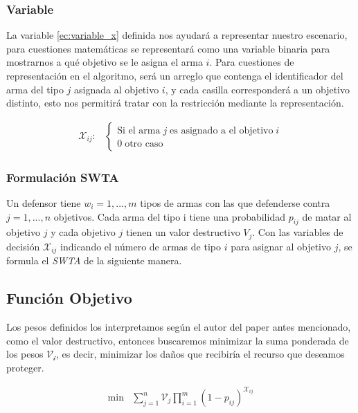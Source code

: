 \subsubsection{Variable}
La variable \ref{ec:variable_x} definida nos ayudará a representar nuestro escenario, para cuestiones matemáticas se representará como una variable binaria para mostrarnos a qué objetivo se le asigna el arma $i$.
Para cuestiones de representación en el algoritmo, será un arreglo que contenga el identificador del arma del tipo $j$ asignada al objetivo $i$, y cada casilla corresponderá a un objetivo distinto, esto nos permitirá tratar con la restricción mediante la representación. 

\begin{align}
    \mathcal{X}_{ij} :&  
    \left\lbrace 
    \begin{array}{l} 
    \text{Si el arma} \; j \; \text{es asignado a el objetivo} \; i \\ 
    0 \; \text{otro caso} 
    \end{array}
    \right.
    \label{ec:variable_x}
\end{align}

\subsubsection{Formulación SWTA}
Un defensor tiene $w_i = 1, ... , m$ tipos de armas con las que defenderse contra $j=1, ... , n$ objetivos.
Cada arma del tipo i tiene una probabilidad $p_{ij}$ de matar al objetivo $j$ y cada objetivo $j$ tienen un valor destructivo $V_j$.
Con las variables de decisi\'on $\mathcal{X}_{ij}$ indicando el n\'umero de armas de tipo $i$ para asignar al objetivo $j$, se formula el \textit{SWTA} de la siguiente manera. \cite[pág 2]{Background}


\subsection{Función Objetivo}

Los pesos definidos los interpretamos según el autor del paper antes mencionado, como el valor destructivo, entonces buscaremos minimizar la suma ponderada de los pesos $\mathcal{V_i}$, es decir, minimizar los daños que recibiría el recurso que deseamos proteger.


\begin{align*}
    \textrm{min} & \sum^{n}_{j=1} \mathcal{V}_j \prod^{m}_{i=1}{(1 - p_{ij})^{\mathcal{X}_{ij}} }
\end{align*}

